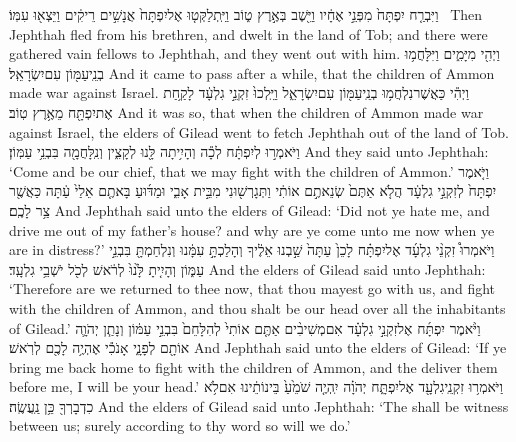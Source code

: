{וַיִּבְרַ֤ח יִפְתָּח֙ מִפְּנֵ֣י אֶחָ֔יו וַיֵּ֖שֶׁב בְּאֶ֣רֶץ ט֑וֹב וַיִּֽתְלַקְּט֤וּ אֶל\maqqaf יִפְתָּח֙ אֲנָשִׁ֣ים רֵיקִ֔ים וַיֵּצְא֖וּ עִמּֽוֹ׃ \petucha }
{Then Jephthah fled from his brethren, and dwelt in the land of Tob; and there were gathered vain fellows to Jephthah, and they went out with him.}
{וַיְהִ֖י מִיָּמִ֑ים וַיִּלָּחֲמ֥וּ בְנֵֽי\maqqaf עַמּ֖וֹן עִם\maqqaf יִשְׂרָאֵֽל׃}
{And it came to pass after a while, that the children of Ammon made war against Israel.}
{וַיְהִ֕י כַּאֲשֶׁר\maqqaf נִלְחֲמ֥וּ בְנֵֽי\maqqaf עַמּ֖וֹן עִם\maqqaf יִשְׂרָאֵ֑ל וַיֵּֽלְכוּ֙ זִקְנֵ֣י גִלְעָ֔ד לָקַ֥חַת אֶת\maqqaf יִפְתָּ֖ח מֵאֶ֥רֶץ טֽוֹב׃}
{And it was so, that when the children of Ammon made war against Israel, the elders of Gilead went to fetch Jephthah out of the land of Tob.}
{וַיֹּאמְר֣וּ לְיִפְתָּ֔ח לְכָ֕ה וְהָיִ֥יתָה לָּ֖נוּ לְקָצִ֑ין וְנִֽלָּחֲמָ֖ה בִּבְנֵ֥י עַמּֽוֹן׃}
{And they said unto Jephthah: ‘Come and be our chief, that we may fight with the children of Ammon.’}
{וַיֹּ֤אמֶר יִפְתָּח֙ לְזִקְנֵ֣י גִלְעָ֔ד הֲלֹ֤א אַתֶּם֙ שְׂנֵאתֶ֣ם אוֹתִ֔י וַתְּגָרְשׁ֖וּנִי מִבֵּ֣ית אָבִ֑י וּמַדּ֜וּעַ בָּאתֶ֤ם אֵלַי֙ עַ֔תָּה כַּאֲשֶׁ֖ר צַ֥ר לָכֶֽם׃}
{And Jephthah said unto the elders of Gilead: ‘Did not ye hate me, and drive me out of my father’s house? and why are ye come unto me now when ye are in distress?’}
{וַיֹּאמְרוּ֩ זִקְנֵ֨י גִלְעָ֜ד אֶל\maqqaf יִפְתָּ֗ח לָכֵן֙ עַתָּה֙ שַׁ֣בְנוּ אֵלֶ֔יךָ וְהָלַכְתָּ֣ עִמָּ֔נוּ וְנִלְחַמְתָּ֖ בִּבְנֵ֣י עַמּ֑וֹן וְהָיִ֤יתָ לָּ֙נוּ֙ לְרֹ֔אשׁ לְכֹ֖ל יֹשְׁבֵ֥י גִלְעָֽד׃}
{And the elders of Gilead said unto Jephthah: ‘Therefore are we returned to thee now, that thou mayest go with us, and fight with the children of Ammon, and thou shalt be our head over all the inhabitants of Gilead.’}
{וַיֹּ֨אמֶר יִפְתָּ֜ח אֶל\maqqaf זִקְנֵ֣י גִלְעָ֗ד אִם\maqqaf מְשִׁיבִ֨ים אַתֶּ֤ם אוֹתִי֙ לְהִלָּחֵם֙ בִּבְנֵ֣י עַמּ֔וֹן וְנָתַ֧ן יְהֹוָ֛ה אוֹתָ֖ם לְפָנָ֑י אָנֹכִ֕י אֶהְיֶ֥ה לָכֶ֖ם לְרֹֽאשׁ׃}
{And Jephthah said unto the elders of Gilead: ‘If ye bring me back home to fight with the children of Ammon, and the \lord\space deliver them before me, I will be your head.’}
{וַיֹּאמְר֥וּ זִקְנֵֽי\maqqaf גִלְעָ֖ד אֶל\maqqaf יִפְתָּ֑ח יְהֹוָ֗ה יִֽהְיֶ֤ה שֹׁמֵ֙עַ֙ בֵּינוֹתֵ֔ינוּ אִם\maqqaf לֹ֥א כִדְבָרְךָ֖ כֵּ֥ן נַֽעֲשֶֽׂה׃}
{And the elders of Gilead said unto Jephthah: ‘The \lord\space shall be witness between us; surely according to thy word so will we do.’}
